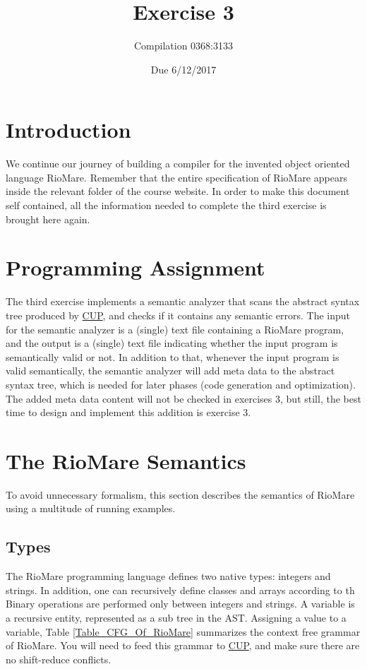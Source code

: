\documentclass{article}
\begin{document}
\title{Exercise 3}
\author{Compilation 0368:3133}
\date{Due 6/12/2017}
\maketitle

\section{Introduction}
We continue our journey of building a compiler
for the invented object oriented language RioMare.
Remember that the entire specification of RioMare appears
inside the relevant folder of the course website.
In order to make this document self contained,
all the information needed to complete the third exercise is brought here again.

\section{Programming Assignment}
The third exercise implements a semantic analyzer that
scans the abstract syntax tree produced by
\href{http://www2.cs.tum.edu/projects/cup/}{CUP},
and checks if it contains any semantic errors.
The input for the semantic analyzer is a (single) text file containing a RioMare program,
and the output is a (single) text file indicating whether the input program
is semantically valid or not.
In addition to that, whenever the input program is valid semantically,
the semantic analyzer will add meta data to the abstract syntax tree,
which is needed for later phases (code generation and optimization).
The added meta data content will not be checked in exercises $3$,
but still, the best time to design and implement this addition is
exercise $3$.

\section{The RioMare Semantics}
To avoid unnecessary formalism, this section describes the semantics of RioMare
using a multitude of running examples. 
\subsection{Types}
The RioMare programming language defines two native types: integers and strings.
In addition, one can recursively define classes and arrays according to th
Binary operations are performed only between integers and strings.
A variable is a recursive entity, represented as a sub tree in the AST.
Assigning a value to a variable, 
Table \ref{Table_CFG_Of_RioMare} summarizes the context free grammar of RioMare.
You will need to feed this grammar to \href{http://www2.cs.tum.edu/projects/cup/}{CUP},
and make sure there are no shift-reduce conflicts.  
\end{document}
